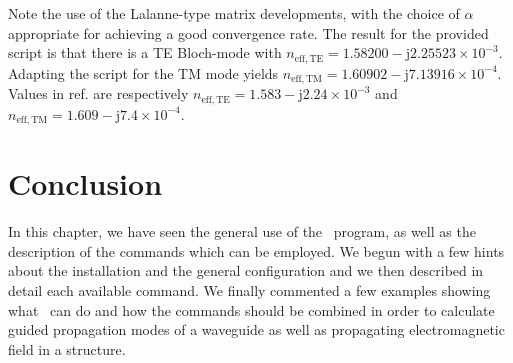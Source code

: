 Note the use of the Lalanne-type matrix developments, with the choice of $\alpha$ appropriate for achieving a good convergence rate.
The result for the provided script is that there is a TE Bloch-mode with $n_\mathrm{eff, TE}=1.58200-\mathrm{j}2.25523\times 10^{-3}$. Adapting the script for the TM mode yields $n_\mathrm{eff, TM}=1.60902-\mathrm{j}7.13916\times 10^{-4}$. Values in ref. \cite{cao2002stable} are respectively $n_\mathrm{eff, TE}=1.583-\mathrm{j}2.24\times 10^{-3}$ and $n_\mathrm{eff, TM}=1.609-\mathrm{j}7.4\times 10^{-4}$.

\section{Conclusion}
In this chapter, we have seen the general use of the \afmm\ program, as well as the description of the commands which can be employed. We begun with a few hints about the installation and the general configuration and we then described in detail each available command. We finally commented a few examples showing what \afmm\ can do and how the commands should be combined in order to calculate guided propagation modes of a waveguide as well as propagating electromagnetic field in a structure.

